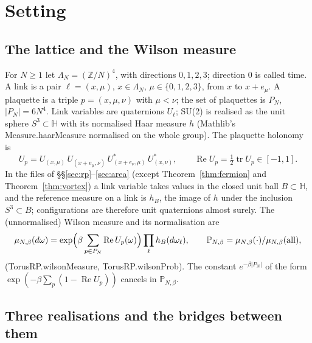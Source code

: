 \documentclass[11pt,a4paper]{article}
\theoremstyle{definition}
\theoremstyle{remark}
\newcommand{\leanus}{\textunderscore\allowbreak{}}
\newcommand{\leandot}{.\allowbreak{}}
\newcommand{\lean}[1]{{\ttfamily\let\_\leanus #1}}
\newcommand{\Z}{\mathbb{Z}}
\newcommand{\HH}{\mathbb{H}}
\newcommand{\tr}{\operatorname{tr}}
\renewcommand{\Re}{\operatorname{Re}}
\begin{document}
\section{Setting}\label{sec:setting}

\subsection{The lattice and the Wilson measure}

For $N\ge1$ let $\Lambda_N=(\Z/N)^4$, with directions $0,1,2,3$; direction $0$ is called time. A link is a pair $\ell=(x,\mu)$, $x\in\Lambda_N$, $\mu\in\{0,1,2,3\}$, from $x$ to $x+e_\mu$. A plaquette is a triple $p=(x,\mu,\nu)$ with $\mu<\nu$; the set of plaquettes is $P_N$, $|P_N|=6N^4$. Link variables are quaternions $U_\ell$; SU(2) is realised as the unit sphere $S^3\subset\HH$ with its normalised Haar measure $h$ (Mathlib's \lean{Measure\leandot{}haarMeasure} normalised on the whole group). The plaquette holonomy is
\[
U_p=U_{(x,\mu)}\,U_{(x+e_\mu,\nu)}\,U_{(x+e_\nu,\mu)}^{*}\,U_{(x,\nu)}^{*},\qquad \Re U_p=\tfrac12\tr U_p\in[-1,1].
\]
In the files of \S\S\ref{sec:rp}--\ref{sec:area} (except Theorem~\ref{thm:fermion} and Theorem~\ref{thm:vortex}) a link variable takes values in the closed unit ball $B\subset\HH$, and the reference measure on a link is $h_B$, the image of $h$ under the inclusion $S^3\subset B$; configurations are therefore unit quaternions almost surely. The (unnormalised) Wilson measure and its normalisation are
\[
\mu_{N,\beta}(d\omega)=\exp\Bigl(\beta\sum_{p\in P_N}\Re U_p(\omega)\Bigr)\prod_{\ell}h_B(d\omega_\ell),\qquad
\mathbb P_{N,\beta}=\mu_{N,\beta}(\cdot)/\mu_{N,\beta}(\text{all}),
\]
(\lean{TorusRP\leandot{}wilsonMeasure}, \lean{TorusRP\leandot{}wilsonProb}). The constant $e^{-\beta|P_N|}$ of the form $\exp(-\beta\sum_p(1-\Re U_p))$ cancels in $\mathbb P_{N,\beta}$.

\subsection{Three realisations and the bridges between them}
\end{document}
